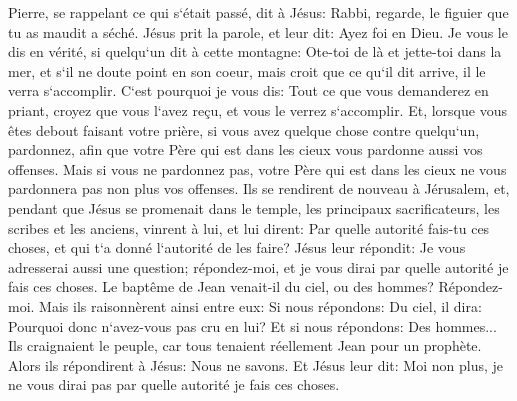 \verse Pierre, se rappelant ce qui s`était passé, dit à Jésus: Rabbi, regarde, le figuier que tu as maudit a séché. 
\verse Jésus prit la parole, et leur dit: Ayez foi en Dieu. 
\verse Je vous le dis en vérité, si quelqu`un dit à cette montagne: Ote-toi de là et jette-toi dans la mer, et s`il ne doute point en son coeur, mais croit que ce qu`il dit arrive, il le verra s`accomplir. 
\verse C`est pourquoi je vous dis: Tout ce que vous demanderez en priant, croyez que vous l`avez reçu, et vous le verrez s`accomplir. 
\verse Et, lorsque vous êtes debout faisant votre prière, si vous avez quelque chose contre quelqu`un, pardonnez, afin que votre Père qui est dans les cieux vous pardonne aussi vos offenses. 
\verse Mais si vous ne pardonnez pas, votre Père qui est dans les cieux ne vous pardonnera pas non plus vos offenses. 
\verse Ils se rendirent de nouveau à Jérusalem, et, pendant que Jésus se promenait dans le temple, les principaux sacrificateurs, les scribes et les anciens, vinrent à lui, 
\verse et lui dirent: Par quelle autorité fais-tu ces choses, et qui t`a donné l`autorité de les faire? 
\verse Jésus leur répondit: Je vous adresserai aussi une question; répondez-moi, et je vous dirai par quelle autorité je fais ces choses. 
\verse Le baptême de Jean venait-il du ciel, ou des hommes? Répondez-moi. 
\verse Mais ils raisonnèrent ainsi entre eux: Si nous répondons: Du ciel, il dira: Pourquoi donc n`avez-vous pas cru en lui? 
\verse Et si nous répondons: Des hommes... Ils craignaient le peuple, car tous tenaient réellement Jean pour un prophète. 
\verse Alors ils répondirent à Jésus: Nous ne savons. Et Jésus leur dit: Moi non plus, je ne vous dirai pas par quelle autorité je fais ces choses. 

\chapter{}

